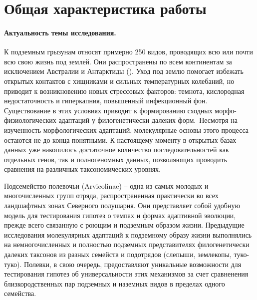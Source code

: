 \section*{Общая характеристика работы}

\paragraph{Актуальность темы исследования.} К подземным грызунам относят примерно 250 видов, проводящих всю или почти всю свою жизнь под землей. Они распространены по всем континентам за исключением Австралии и Антарктиды (\cite{Fang2015}). Уход под землю помогает избежать открытых контактов с хищниками и сильных температурных колебаний, но приводит к возникновению новых стрессовых факторов: темнота, кислородная недостаточность и гиперкапния, повышенный инфекционный фон. Существование в этих условиях приводит к формированию сходных морфо-физиологических адаптаций у филогенетически далеких форм. Несмотря на изученность морфологических адаптаций, молекулярные основы этого процесса остаются не до конца понятными. К настоящему моменту в открытых базах данных уже накопилось достаточное количество последовательностей как отдельных генов, так и полногеномных данных, позволяющих проводить сравнения на различных таксономических уровнях.

Подсемейство полевочьи (Arvicolinae) -- одна из самых молодых и многочисленных групп отряда, распространенная практически во всех ландшафтных зонах Северного полушария. Они представляет собой удобную модель для тестирования гипотез о темпах и формах адаптивной эволюции, прежде всего связанную с роющим и подземным образом жизни. Предыдущие исследования молекулярных адаптаций к подземному образу жизни выполнялись на немногочисленных и полностью подземных представителях филогенетически далеких таксонов из разных семейств и подотрядов (слепыши, землекопы, туко-туко). Полевки, в свою очередь, предоставляют уникальные возможности для тестирования гипотез об универсальности этих механизмов за счет сравненения близкородственных пар подземных и наземных видов в пределах одного семейства. 




